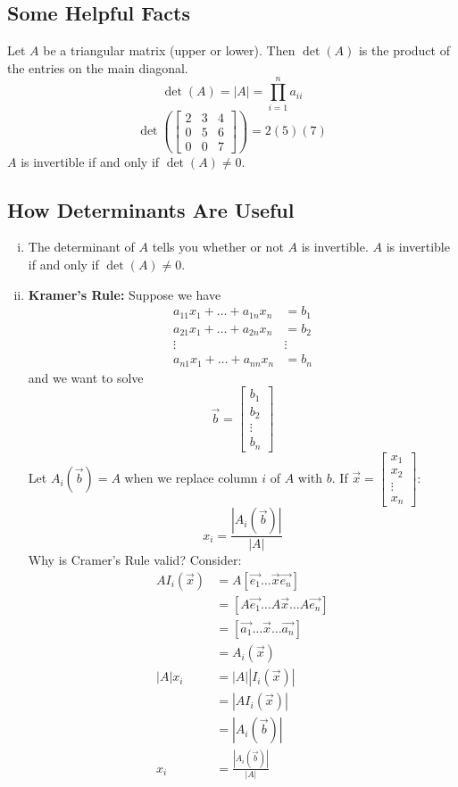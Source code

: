 \documentclass[letterpaper, 12pt]{math}
\begin{document}
\subsection*{Some Helpful Facts}
Let \( A \) be a triangular matrix (upper or lower). Then \( \det(A) \) is
the product of the entries on the main diagonal.
\[ \det(A) = |A| = \prod_{i=1}^{n}a_{ii} \]
\[ \det\left(\begin{bmatrix}2 & 3 & 4 \\ 0 & 5 & 6 \\ 0 & 0 & 7
  \end{bmatrix}\right) = 2(5)(7) \]
\( A \) is invertible if and only if \( \det(A) \ne 0 \).

\subsection*{How Determinants Are Useful}
\begin{enumerate}[(i)]
  \item The determinant of \( A \) tells you whether or not \( A \) is
  invertible. \( A \) is invertible if and only if \( \det(A) \ne 0 \).
  \item \textbf{Kramer's Rule:} Suppose we have
  \begin{align*}
    a_{11}x_1+\dots+a_{1n}x_n &= b_1 \\
    a_{21}x_1+\dots+a_{2n}x_n &= b_2 \\
    \vdots & \vdots \\
    a_{n1}x_1+\dots+a_{nn}x_n &= b_n
  \end{align*}
  and we want to solve
  \[ \vec{b} = \begin{bmatrix}b_1 \\ b_2 \\ \vdots \\ b_n\end{bmatrix} \]
  Let \( A_i(\vec{b}) = A \) when we replace column \( i \) of \( A \) with
  \( b \). If \( \vec{x} = \begin{bmatrix}x_1 \\ x_2 \\ \vdots \\ x_n
  \end{bmatrix} \):
  \[ x_i = \frac{|A_i(\vec{b})|}{|A|} \]
  Why is Cramer's Rule valid? Consider:
  \begin{align*}
    AI_i(\vec{x}) &= A[\vec{e_1}\dots\vec{x}\vec{e_n}] \\
    &= [A\vec{e_1}\dots A\vec{x}\dots A\vec{e_n}] \\
    &= [\vec{a_1}\dots\vec{x}\dots\vec{a_n}] \\
    &= A_i(\vec{x}) \\
    |A|x_i &= |A||I_i(\vec{x})| \\
    &= |AI_i(\vec{x})| \\
    &= |A_i(\vec{b})| \\
    x_i &= \frac{|A_i(\vec{b})|}{|A|}
  \end{align*}
\end{enumerate}
\end{document}

